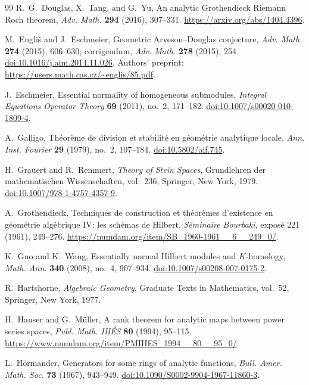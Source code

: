 \documentclass[11pt,reqno]{amsart}
\numberwithin{equation}{section}
\theoremstyle{definition}
\theoremstyle{remark}
\begin{document}
\begin{thebibliography}{99}
R.~G.~Douglas, X.~Tang, and G.~Yu, An analytic Grothendieck Riemann Roch
theorem, \emph{Adv. Math.} \textbf{294} (2016), 307--331.
\url{https://arxiv.org/abs/1404.4396}.

M.~Engli\v{s} and J.~Eschmeier, Geometric Arveson--Douglas conjecture,
\emph{Adv. Math.} \textbf{274} (2015), 606--630;
corrigendum, \emph{Adv. Math.} \textbf{278} (2015), 254.
\href{https://doi.org/10.1016/j.aim.2014.11.026}{doi:10.1016/j.aim.2014.11.026}.
Authors' preprint:
\url{https://users.math.cas.cz/~englis/85.pdf}.

J.~Eschmeier, Essential normality of homogeneous submodules,
\emph{Integral Equations Operator Theory} \textbf{69} (2011), no.~2,
171--182.
\href{https://doi.org/10.1007/s00020-010-1809-4}{doi:10.1007/s00020-010-1809-4}.

A.~Galligo, Th\'eor\`eme de division et stabilit\'e en g\'eom\'etrie
analytique locale, \emph{Ann. Inst. Fourier} \textbf{29} (1979), no.~2,
107--184. \href{https://doi.org/10.5802/aif.745}{doi:10.5802/aif.745}.

H.~Grauert and R.~Remmert, \emph{Theory of Stein Spaces},
Grundlehren der mathematischen Wissenschaften, vol.~236,
Springer, New York, 1979.
\href{https://doi.org/10.1007/978-1-4757-4357-9}{doi:10.1007/978-1-4757-4357-9}.

A.~Grothendieck, Techniques de construction et th\'eor\`emes
d'existence en g\'eom\'etrie alg\'ebrique IV: les sch\'emas de Hilbert,
\emph{S\'eminaire Bourbaki}, expos\'e 221 (1961), 249--276.
\url{https://numdam.org/item/SB_1960-1961__6__249_0/}.

K.~Guo and K.~Wang, Essentially normal Hilbert modules and
$K$-homology, \emph{Math. Ann.} \textbf{340} (2008), no.~4,
907--934.
\href{https://doi.org/10.1007/s00208-007-0175-2}{doi:10.1007/s00208-007-0175-2}.

R.~Hartshorne, \emph{Algebraic Geometry}, Graduate Texts in
Mathematics, vol.~52, Springer, New York, 1977.

H.~Hauser and G.~M\"uller, A rank theorem for analytic maps between power
series spaces, \emph{Publ. Math. IH\'ES} \textbf{80} (1994), 95--115.
\url{https://www.numdam.org/item/PMIHES_1994__80__95_0/}.

L.~H\"ormander, Generators for some rings of analytic functions,
\emph{Bull. Amer. Math. Soc.} \textbf{73} (1967), 943--949.
\href{https://doi.org/10.1090/S0002-9904-1967-11860-3}{doi:10.1090/S0002-9904-1967-11860-3}.


\end{thebibliography}
\end{document}
